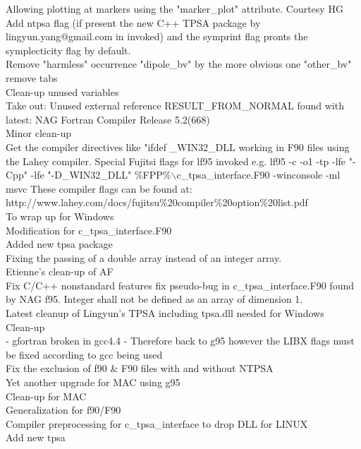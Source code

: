 Allowing plotting at markers using the "marker\_plot" attribute. Courtesy HG  \\ 
Add ntpsa flag (if present the new C++ TPSA package by lingyun.yang@gmail.com in invoked) and the symprint flag pronts the symplecticity flag by default.  \\ 
Remove "harmless" occurrence "dipole\_bv" by the more obvious one "other\_bv"  \\ 
remove tabs  \\ 
Clean-up unused variables  \\ 
Take out:  Unused external reference RESULT\_FROM\_NORMAL found with latest: NAG Fortran Compiler Release 5.2(668)  \\ 
Minor clean-up  \\ 
Get the compiler directives like "ifdef \_WIN32\_DLL working in F90 files using the Lahey compiler. Special Fujitsi flags for lf95 invoked e.g. lf95 -c -o1 -tp -lfe "-Cpp" -lfe "-D\_WIN32\_DLL" \%FPP\%$\backslash$c\_tpsa\_interface.F90 -winconsole -ml msvc  These compiler flags can be found at:  http://www.lahey.com/docs/fujitsu\%20compiler\%20option\%20list.pdf  \\ 
To wrap up for Windows  \\ 
Modification for c\_tpsa\_interface.F90  \\ 
Added new tpsa package  \\ 
Fixing the passing of a double array instead of an integer array.  \\ 
Etienne's clean-up of AF  \\ 
Fix C/C++ nonstandard features fix pseudo-bug in c\_tpsa\_interface.F90 found by NAG f95. Integer shall not be defined as an array of dimension 1.  \\ 
Latest cleanup of Lingyun's TPSA including tpsa.dll needed for Windows  \\ 
Clean-up  \\ 
- gfortran broken in gcc4.4 - Therefore back to g95 however the LIBX flags must be fixed according to gcc being used  \\ 
Fix the exclusion of f90 \& F90 files with and without NTPSA  \\ 
Yet another upgrade for MAC using g95  \\ 
Clean-up for MAC  \\ 
Generalization for f90/F90  \\ 
Compiler preprocessing for c\_tpsa\_interface to drop DLL for LINUX  \\ 
Add new tpsa  \\ 
